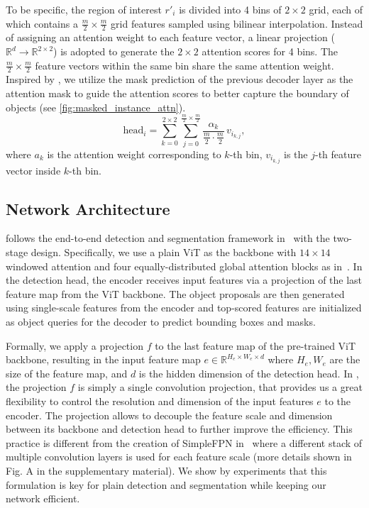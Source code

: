 To be specific, the region of interest $r'_i$ is divided into 4 bins of $2 \times 2$ grid, each of which contains a $\frac{m}{2} \times \frac{m}{2}$ grid features sampled using bilinear interpolation. Instead of assigning an attention weight to each feature vector, a linear projection ($\mathbb{R}^d \rightarrow \mathbb{R}^{2 \times 2}$) is adopted to generate the $2 \times 2$ attention scores for 4 bins. The $\frac{m}{2} \times \frac{m}{2}$ feature vectors within the same bin share the same attention weight. Inspired by \cite{cheng2022mask2former}, we utilize the mask prediction of the previous decoder layer as the attention mask to guide the attention scores to better capture the boundary of objects (see \cref{fig:masked_instance_attn}).
\begin{equation}
    \mathrm{head}_i = \sum_{k=0}^{2 \times 2} \sum_{j=0}^{\frac{m}{2} \times \frac{m}{2}} \frac{\alpha_k}{\frac{m}{2} \cdot \frac{m}{2}} \, v_{i_{k,j}},
\end{equation}
where $a_k$ is the attention weight corresponding to $k$-th bin, $v_{i_{k,j}}$ is the $j$-th feature vector inside $k$-th bin.

\subsection{Network Architecture}

\ours follows the end-to-end detection and segmentation framework in~\cite{nguyen2022boxer} with the two-stage design. Specifically, we use a plain ViT as the backbone with $14\times14$ windowed attention and four equally-distributed global attention blocks as in~\cite{li2022vitdet}. In the detection head, the \ours encoder receives input features via a projection of the last feature map from the ViT backbone. The object proposals are then generated using single-scale features from the encoder and top-scored features are initialized as object queries for the \ours decoder to predict bounding boxes and masks. 

Formally, we apply a projection $f$ to the last feature map of the pre-trained ViT backbone, resulting in the input feature map $e \in \mathbb{R}^{H_e \times W_e \times d}$ where $H_e, W_e$ are the size of the feature map, and $d$ is the hidden dimension of the detection head. In \ours, the projection $f$ is simply a single convolution projection, that provides us a great flexibility to control the resolution and dimension of the input features $e$ to the encoder. The projection allows \ours to decouple the feature scale and dimension between its backbone and detection head to further improve the efficiency. This practice is different from the creation of SimpleFPN in~\cite{li2022vitdet} where a different stack of multiple convolution layers is used for each feature scale (more details shown in Fig. A in the supplementary material). We show by experiments that this formulation is key for plain detection and segmentation while keeping our network efficient.

